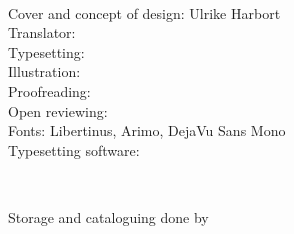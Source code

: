 {\\
%
\bigskip

Cover and concept of design:
Ulrike Harbort \\
\if\@translator\empty\else
Translator:
\@translator \\
\fi
\if\@typesetter\empty\else
Typesetting:
\@typesetter \\
\fi
\if\@illustrator\empty\else
Illustration:
\@illustrator \\
\fi
\if\@proofreader\empty\else
Proofreading:
\@proofreader \\
\fi
\if\@openreviewer\empty\else
Open reviewing:
\@openreviewer \\
\fi
Fonts: Libertinus, Arimo, DejaVu Sans Mono\lsAdditionalFontsImprint\\
Typesetting software: \XeLaTeX

\bigskip

\publisherstreetaddress\\
\publisherurl

\vfill

Storage and cataloguing done by \storageinstitution\\[3ex]

\\[3ex]



}



\newcommand{\lsDedication}{%
        \thispagestyle{empty}
	\vspace*{\fill}
	\begin{center}
	{\lsDedicationFont
	\@dedication\par}
	\end{center}
	\vspace*{\fill}
	\clearpage
}



